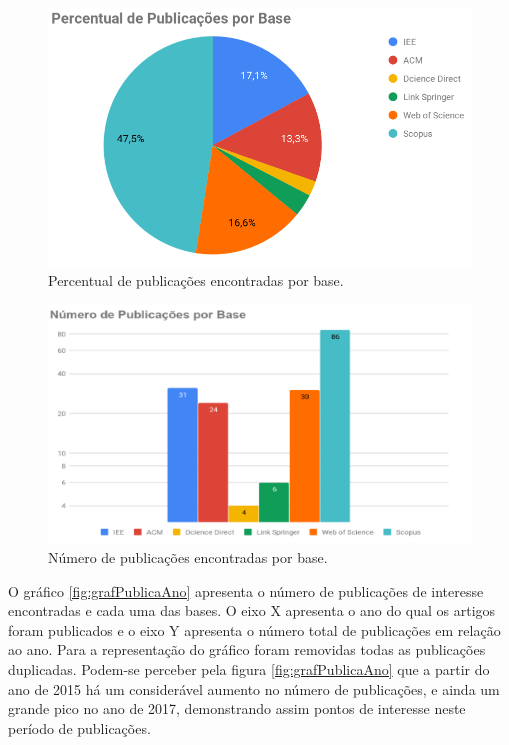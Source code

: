 \documentclass[tid,table]{texufpel} %
\begin{document}
\begin{figure}[ht]
	\centering
	\includegraphics[width=.9\textwidth]{imagens/GrafPizPubAno.png}
	\caption{Percentual de publicações encontradas por base.}
	\label{fig:GrafPizPubAno}
\end{figure}

\begin{figure}[ht]
	\centering
	\includegraphics[width=.9\textwidth]{imagens/GrafBarraPubAno.png}
	\caption{Número de publicações encontradas por base.}
	\label{fig:GrafBarraPubAno}
\end{figure}


O gráfico \ref{fig:grafPublicaAno} apresenta o número de publicações de interesse encontradas e cada uma das bases. O eixo X apresenta o ano do qual os artigos foram publicados e o eixo Y apresenta o número total de publicações em relação ao ano. Para a representação do gráfico foram removidas todas as publicações duplicadas. Podem-se perceber pela figura \ref{fig:grafPublicaAno} que a partir do ano de 2015 há um considerável aumento no número de publicações, e ainda um grande pico no ano de 2017, demonstrando assim pontos de interesse neste período de publicações.
\end{document}
